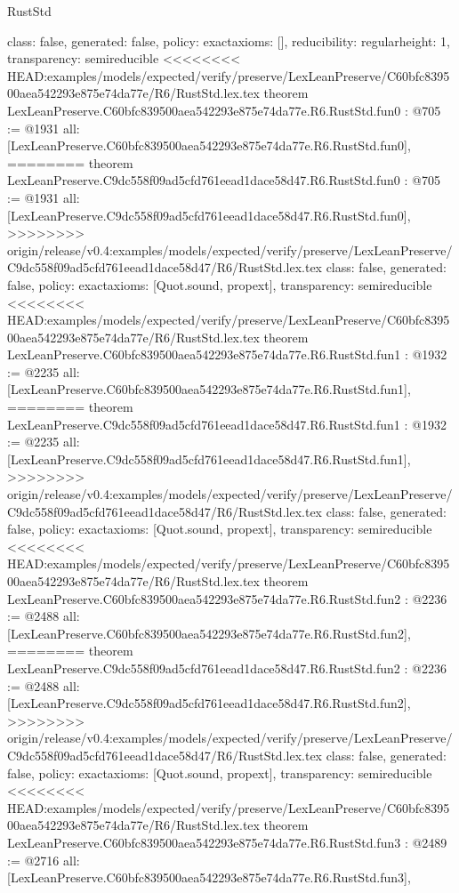 \begin{lexlean}{RustStd}
\begin{coremodule}
{\begin{coremodule}
{{{  class: false,
  generated: false,
  policy: exact{axioms: []},
  reducibility: regular{height: 1},
  transparency: semireducible
}
<<<<<<<< HEAD:examples/models/expected/verify/preserve/LexLeanPreserve/C60bfc839500aea542293e875e74da77e/R6/RustStd.lex.tex
theorem LexLeanPreserve.C60bfc839500aea542293e875e74da77e.R6.RustStd.fun0 : @705 := @1931 {
  all: [LexLeanPreserve.C60bfc839500aea542293e875e74da77e.R6.RustStd.fun0],
========
theorem LexLeanPreserve.C9dc558f09ad5cfd761eead1dace58d47.R6.RustStd.fun0 : @705 := @1931 {
  all: [LexLeanPreserve.C9dc558f09ad5cfd761eead1dace58d47.R6.RustStd.fun0],
>>>>>>>> origin/release/v0.4:examples/models/expected/verify/preserve/LexLeanPreserve/C9dc558f09ad5cfd761eead1dace58d47/R6/RustStd.lex.tex
  class: false,
  generated: false,
  policy: exact{axioms: [Quot.sound, propext]},
  transparency: semireducible
}
<<<<<<<< HEAD:examples/models/expected/verify/preserve/LexLeanPreserve/C60bfc839500aea542293e875e74da77e/R6/RustStd.lex.tex
theorem LexLeanPreserve.C60bfc839500aea542293e875e74da77e.R6.RustStd.fun1 : @1932 := @2235 {
  all: [LexLeanPreserve.C60bfc839500aea542293e875e74da77e.R6.RustStd.fun1],
========
theorem LexLeanPreserve.C9dc558f09ad5cfd761eead1dace58d47.R6.RustStd.fun1 : @1932 := @2235 {
  all: [LexLeanPreserve.C9dc558f09ad5cfd761eead1dace58d47.R6.RustStd.fun1],
>>>>>>>> origin/release/v0.4:examples/models/expected/verify/preserve/LexLeanPreserve/C9dc558f09ad5cfd761eead1dace58d47/R6/RustStd.lex.tex
  class: false,
  generated: false,
  policy: exact{axioms: [Quot.sound, propext]},
  transparency: semireducible
}
<<<<<<<< HEAD:examples/models/expected/verify/preserve/LexLeanPreserve/C60bfc839500aea542293e875e74da77e/R6/RustStd.lex.tex
theorem LexLeanPreserve.C60bfc839500aea542293e875e74da77e.R6.RustStd.fun2 : @2236 := @2488 {
  all: [LexLeanPreserve.C60bfc839500aea542293e875e74da77e.R6.RustStd.fun2],
========
theorem LexLeanPreserve.C9dc558f09ad5cfd761eead1dace58d47.R6.RustStd.fun2 : @2236 := @2488 {
  all: [LexLeanPreserve.C9dc558f09ad5cfd761eead1dace58d47.R6.RustStd.fun2],
>>>>>>>> origin/release/v0.4:examples/models/expected/verify/preserve/LexLeanPreserve/C9dc558f09ad5cfd761eead1dace58d47/R6/RustStd.lex.tex
  class: false,
  generated: false,
  policy: exact{axioms: [Quot.sound, propext]},
  transparency: semireducible
}
<<<<<<<< HEAD:examples/models/expected/verify/preserve/LexLeanPreserve/C60bfc839500aea542293e875e74da77e/R6/RustStd.lex.tex
theorem LexLeanPreserve.C60bfc839500aea542293e875e74da77e.R6.RustStd.fun3 : @2489 := @2716 {
  all: [LexLeanPreserve.C60bfc839500aea542293e875e74da77e.R6.RustStd.fun3],
}}}}}}
\end{coremodule}}
\end{coremodule}
\end{lexlean}
